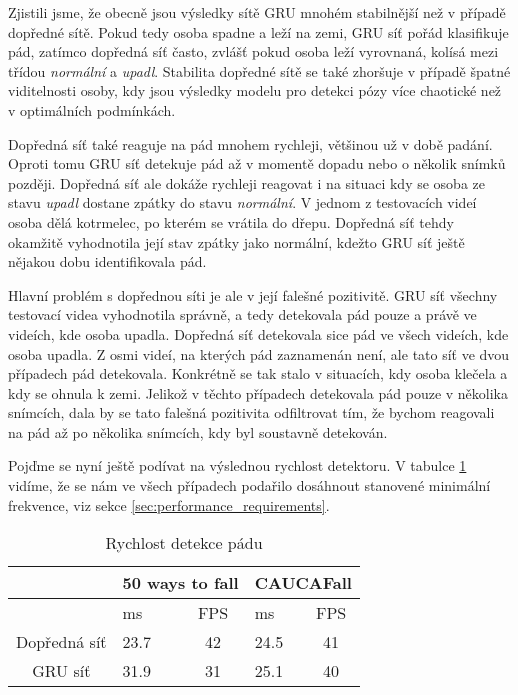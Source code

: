 Zjistili jsme, že obecně jsou výsledky sítě GRU mnohém stabilnější než v
případě dopředné sítě. Pokud tedy osoba spadne a leží na zemi, GRU síť pořád
klasifikuje pád, zatímco dopředná síť často, zvlášť pokud osoba leží vyrovnaná,
kolísá mezi třídou \textit{normální} a \textit{upadl}. Stabilita dopředné sítě
se také zhoršuje v případě špatné viditelnosti osoby, kdy jsou výsledky modelu
pro detekci pózy více chaotické než v optimálních podmínkách.

Dopředná síť také reaguje na pád mnohem rychleji, většinou už v době padání.
Oproti tomu GRU síť detekuje pád až v momentě dopadu nebo o několik snímků
později. Dopředná síť ale dokáže rychleji reagovat i na situaci kdy se osoba ze
stavu \textit{upadl} dostane zpátky do stavu \textit{normální}. V jednom z
testovacích videí osoba dělá kotrmelec, po kterém se vrátila do dřepu. Dopředná
síť tehdy okamžitě vyhodnotila její stav zpátky jako normální, kdežto GRU síť
ještě nějakou dobu identifikovala pád.

Hlavní problém s dopřednou síti je ale v její falešné pozitivitě. GRU síť
všechny testovací videa vyhodnotila správně, a tedy detekovala pád pouze a
právě ve videích, kde osoba upadla. Dopředná síť detekovala sice pád ve všech
videích, kde osoba upadla. Z osmi videí, na kterých pád zaznamenán není, ale
tato síť ve dvou případech pád detekovala. Konkrétně se tak stalo v situacích,
kdy osoba klečela a kdy se ohnula k zemi. Jelikož v těchto případech detekovala
pád pouze v několika snímcích, dala by se tato falešná pozitivita odfiltrovat
tím, že bychom reagovali na pád až po několika snímcích, kdy byl soustavně
detekován.

Pojďme se nyní ještě podívat na výslednou rychlost detektoru. V tabulce
\ref{tab:detectorSpeed} vidíme, že se nám ve všech případech podařilo dosáhnout
stanovené minimální frekvence, viz sekce \ref{sec:performance_requirements}.

\begin{table}[htbp]
    \caption{Rychlost detekce pádu}
    \label{tab:detectorSpeed}
    \begin{tabular}{|c|cc|cc|}
        \hline
                     & \multicolumn{2}{l|}{50 ways to fall} & \multicolumn{2}{l|}{CAUCAFall}                                   \\ \hline
                     & \multicolumn{1}{l|}{ms}              & FPS                            & \multicolumn{1}{l|}{ms}   & FPS \\ \hline
        Dopředná síť & \multicolumn{1}{l|}{23.7}            & 42                             & \multicolumn{1}{l|}{24.5} & 41  \\ \hline
        GRU síť      & \multicolumn{1}{l|}{31.9}            & 31                             & \multicolumn{1}{l|}{25.1} & 40  \\ \hline
    \end{tabular}
\end{table}
\endinput

